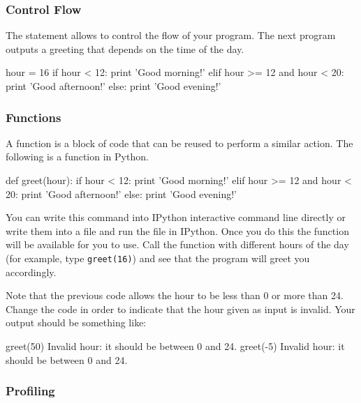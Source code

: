 \subsubsection{Control Flow}

The  statement allows to control the flow of your program. The next program outputs a greeting that depends on the time of the day.

\begin{python}
hour = 16
if hour < 12:
    print 'Good morning!'
elif hour >= 12 and hour < 20:
    print 'Good afternoon!'
else:
    print 'Good evening!'
\end{python}

 
\subsubsection{Functions}

A function is a block of code that can be reused to perform a similar action. The following is a function in Python. 

\begin{python}
def greet(hour):
    if hour < 12:
        print 'Good morning!'
    elif hour >= 12 and hour < 20:
        print 'Good afternoon!'
    else:
        print 'Good evening!'
\end{python}

You can write this command into IPython interactive command line directly or write them into a file and run the file in IPython. Once you do this the function will be available for you to use. Call the function  with different hours of the day (for example, type \texttt{greet(16)}) and see that the program will greet you accordingly.

\begin{exercise}
Note that the previous code allows the hour to be less than 0 or more than 24. Change the code in order to indicate that the hour given as input is invalid. Your output should be something like:

\begin{python}
greet(50)
Invalid hour: it should be between 0 and 24.
greet(-5)
Invalid hour: it should be between 0 and 24.
\end{python}

\end{exercise}

\subsubsection{Profiling}

